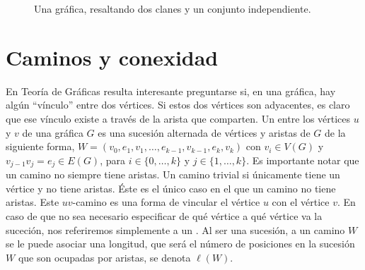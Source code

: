 \begin{figure}[ht!]
    \centering
    \caption{Una gr\'afica, resaltando dos clanes y un conjunto independiente.}
    \label{fig:ClanInd}
\end{figure}


\section{Caminos y conexidad}
\label{sec:CamConex}

En Teor\'ia de Gr\'aficas resulta interesante preguntarse si, en una gr\'afica,
hay alg\'un ``v\'inculo'' entre dos v\'ertices. Si estos dos v\'ertices son
adyacentes, es claro que ese v\'inculo existe a trav\'es de la arista que
comparten. Un  entre los v\'ertices $u$ y $v$ de una
gr\'afica $G$ es una sucesi\'on alternada de v\'ertices y aristas de $G$ de la
siguiente forma, $W=(v_0, e_1,v_1, \dots, e_{k-1},v_{k-1}, e_k,v_k)$ con $v_i
\in V(G)$ y $v_{j-1}v_j = e_j \in E(G)$, para $i \in \{0, \dots, k\}$ y $j \in
\{ 1, \dots, k\}$. Es importante notar que un camino no siempre tiene aristas.
Un camino trivial si \'unicamente tiene un v\'ertice y no tiene aristas. \'Este
es el \'unico caso en el que un camino no tiene aristas. Este $uv$-camino es una
forma de vincular el v\'ertice $u$ con el v\'ertice $v$. En caso de que no sea
necesario especificar de qu\'e v\'ertice a qu\'e v\'ertice va la suceci\'on, nos
referiremos simplemente a un . Al ser una sucesi\'on, a un camino
$W$ se le puede asociar una longitud, que ser\'a el n\'umero de posiciones en la
sucesi\'on $W$ que son ocupadas por aristas, se denota $\ell(W)$. 


